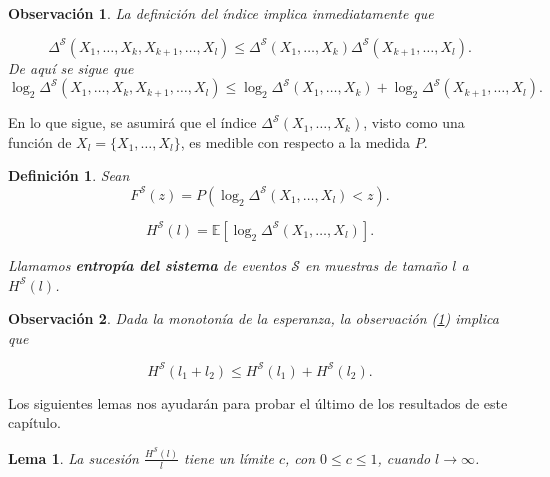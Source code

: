 \documentclass{report}
\newtheorem{lem}{Lema}[section]
\newtheorem{dfn}{Definición}[section]
\newtheorem{obs}{Observación}[section]
\begin{document}
\begin{obs}\label{obs:desigualdad triangular indice de un sistema}
    La definición del índice implica inmediatamente que  

    \begin{equation*}
    \Delta^{\mathcal{S}}(X_1, \dots, X_{k}, X_{k+1}, \dots,X_l) \leq \Delta^{\mathcal{S}}(X_1, \dots, X_k) \Delta^{\mathcal{S}}(X_{k+1}, \dots, X_l).
    \end{equation*}
    De aquí se sigue que  
    \begin{equation*}
    \log_2 \Delta^{\mathcal{S}}(X_1, \dots, X_{k}, X_{k+1}, \dots,X_l) \leq \log_2 \Delta^{\mathcal{S}}(X_1, \dots, X_k) + \log_2 \Delta^{\mathcal{S}}(X_{k+1}, \dots, X_l).
    \end{equation*}\newline
\end{obs}


En lo que sigue, se asumirá que el índice \( \Delta^{\mathcal{S}}(X_1, \dots, X_k) \), visto como una función de 
\( X_l = \{X_1, \dots, X_l\} \), es medible con respecto a la medida \( P \).\newline

\begin{dfn}
    Sean  
    \[
    F^{\mathcal{S}}(z) = P\left(\log_2 \Delta^{\mathcal{S}}(X_1, \dots, X_l) < z \right).
    \]
     
    \[
    H^{\mathcal{S}}(l) = \mathbb{E} \left[ \log_2 \Delta^{\mathcal{S}}(X_1, \dots, X_l) \right].
    \]\newline

    Llamamos \textbf{entropía del sistema} de eventos \( \mathcal{S} \) en muestras de tamaño \( l \) a  $H^{\mathcal{S}}(l)$.\newline

\end{dfn}

\begin{obs}
    Dada la monotonía de la esperanza, la observación (\ref{obs:desigualdad triangular indice de un sistema}) implica que  
    
    \[
        H^{\mathcal{S}}(l_1 + l_2) \leq H^{\mathcal{S}}(l_1) + H^{\mathcal{S}}(l_2).
    \]\newline
\end{obs}

Los siguientes lemas nos ayudarán para probar el último de los resultados de este capítulo.\newline

\begin{lem}\label{lema 3}
    La sucesión \( \frac{H^{\mathcal{S}}(l)}{l} \) tiene un límite \( c \), con \( 0 \leq c \leq 1 \), cuando \( l \to \infty \).
\end{lem}
    
\end{document}
